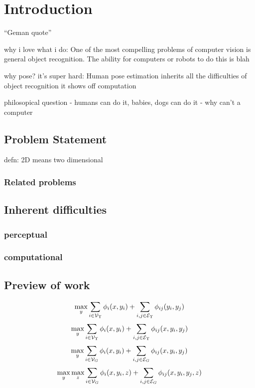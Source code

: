 \chapter{Introduction}

``Geman quote''

why i love what i do:
One of the most compelling problems of computer vision is general object 
recognition.  The ability for computers or robots to do this is blah

why pose?
it's super hard: Human pose estimation inherits all the difficulties of object 
recognition
it shows off computation

philosopical question - humans can do it, babies,  dogs can do it - why can't a 
computer

\section{Problem Statement}

defn: 2D means two dimensional
\subsection{Related problems}

\section{Inherent difficulties}
\subsection{perceptual}
\subsection{computational}

\section{Preview of work}

$$ \max_y \sum_{i \in \mathcal{V}_{\Upsilon}} \phi_i(x,y_i) + \sum_{i,j \in \mathcal{E}_{\Upsilon}} \phi_{ij}(y_i,y_j) $$
$$ \max_y \sum_{i \in \mathcal{V}_{\Upsilon}} \phi_i(x,y_i) + \sum_{i,j \in \mathcal{E}_{\Upsilon}} \phi_{ij}(x,y_i,y_j) $$
$$ \max_y \sum_{i \in \mathcal{V}_{G}} \phi_i(x,y_i) + \sum_{i,j\in  \mathcal{E}_{G}} \phi_{ij}(x,y_i,y_j) $$
$$ \max_y \max_z \sum_{i \in \mathcal{V}_{G}} \phi_i(x,y_i,z) + \sum_{i,j \in \mathcal{E}_{G}} \phi_{ij}(x,y_i,y_j,z)$$

